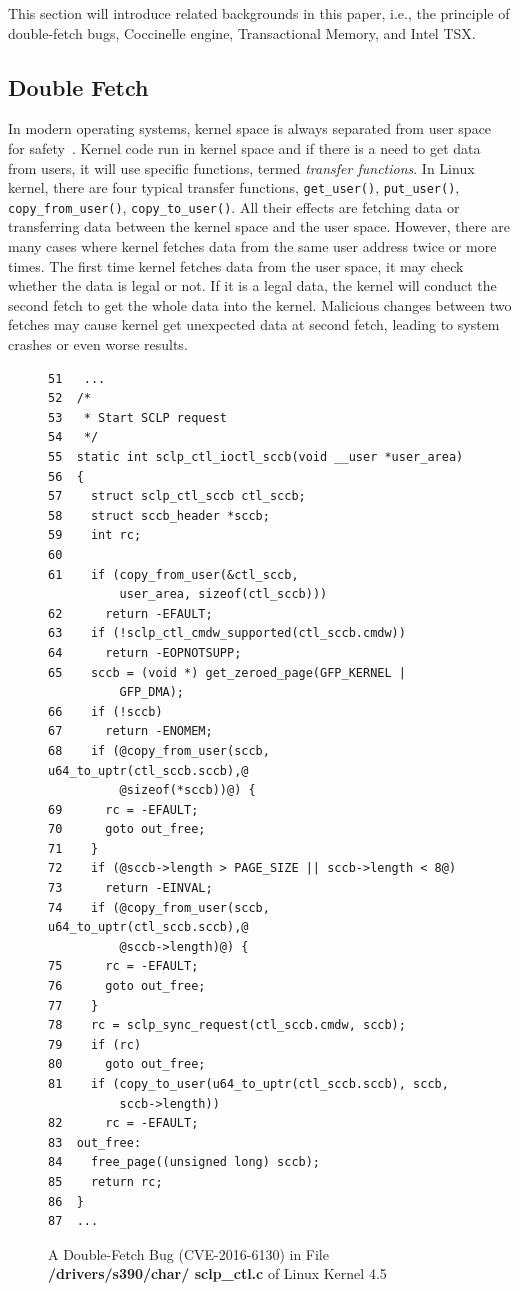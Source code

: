 \documentclass[10pt]{llncs}
\begin{document}
This section will introduce related backgrounds in this paper, i.e., the principle of double-fetch bugs, Coccinelle engine, Transactional Memory, and Intel TSX.

\subsection{Double Fetch}
\label{back1}
In modern operating systems, kernel space is always separated from user space for safety~\cite{swift2003improving}. Kernel code run in kernel space and if there is a need to get data from users, it will use specific functions, termed \emph{transfer functions}. In Linux kernel, there are four typical transfer functions, \verb:get_user():, \verb:put_user():, \verb:copy_from_user():, \verb:copy_to_user():. All their effects are fetching data or transferring data between the kernel space and the user space. However, there are many cases where kernel fetches data from the same user address twice or more times. The first time kernel fetches data from the user space, it may check whether the data is legal or not. If it is a legal data, the kernel will conduct the second fetch to get the whole data into the kernel. Malicious changes between two fetches may cause kernel get unexpected data at second fetch, leading to system crashes or even worse results.

\begin{figure}[t]
  \centering
\begin{lstlisting}[style=code]
51   ...
52  /*
53   * Start SCLP request
54   */
55  static int sclp_ctl_ioctl_sccb(void __user *user_area)
56  {
57    struct sclp_ctl_sccb ctl_sccb;
58    struct sccb_header *sccb;
59    int rc;
60  
61    if (copy_from_user(&ctl_sccb, 
          user_area, sizeof(ctl_sccb)))
62      return -EFAULT;
63    if (!sclp_ctl_cmdw_supported(ctl_sccb.cmdw))
64      return -EOPNOTSUPP;
65    sccb = (void *) get_zeroed_page(GFP_KERNEL |
          GFP_DMA);
66    if (!sccb)
67      return -ENOMEM;
68    if (@copy_from_user(sccb, u64_to_uptr(ctl_sccb.sccb),@
          @sizeof(*sccb))@) {
69      rc = -EFAULT;
70      goto out_free;
71    }
72    if (@sccb->length > PAGE_SIZE || sccb->length < 8@)
73      return -EINVAL;
74    if (@copy_from_user(sccb, u64_to_uptr(ctl_sccb.sccb),@ 
          @sccb->length)@) {
75      rc = -EFAULT;
76      goto out_free;
77    }
78    rc = sclp_sync_request(ctl_sccb.cmdw, sccb);
79    if (rc)
80      goto out_free;
81    if (copy_to_user(u64_to_uptr(ctl_sccb.sccb), sccb,
          sccb->length))
82      rc = -EFAULT;
83  out_free:
84    free_page((unsigned long) sccb);
85    return rc;
86  }
87  ...
\end{lstlisting}
  \caption{A Double-Fetch Bug (CVE-2016-6130) in File \textbf{/drivers/s390/char/ sclp\_ctl.c} of Linux Kernel 4.5}
  \label{df-6130}
\end{figure}
\end{document}
